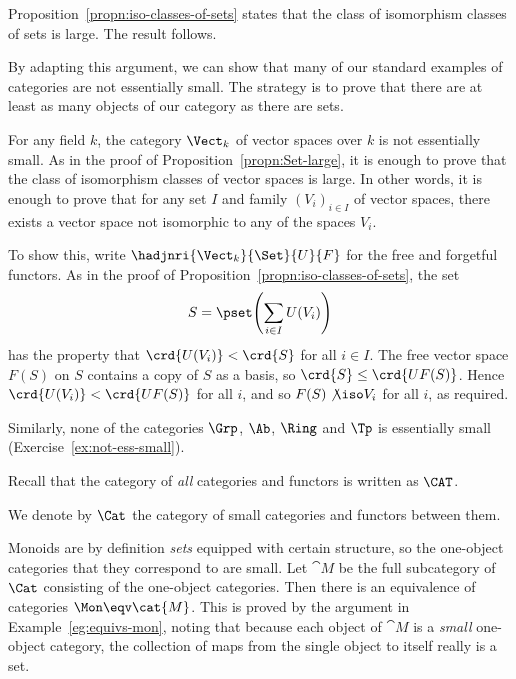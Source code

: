 \begin{pf}
Proposition~\ref{propn:iso-classes-of-sets} states that the class of
isomorphism classes of sets is large.  The result follows.
\end{pf}

By adapting this argument, we can show that many of our standard examples
of categories are not essentially small.  The strategy is to prove that
there are at least as many objects of our category as there are sets.

\begin{example}
For any field $k$, the category $\Vect_k$ of vector%
%
%
spaces over $k$ is not essentially small.  As in the proof of
Proposition~\ref{propn:Set-large}, it is enough to prove that the class of
isomorphism classes of vector spaces is large.  In other words, it is
enough to prove that for any set $I$ and family $(V_i)_{i \in I}$ of vector
spaces, there exists a vector space not isomorphic to any of the spaces
$V_i$.

To show this, write $\hadjnri{\Vect_k}{\Set}{U}{F}$ for the free
and forgetful functors.  As in the proof of
Proposition~\ref{propn:iso-classes-of-sets}, the set
\[
S = \pset \Biggl( \sum_{i \in I} U(V_i) \Biggr) 
\]
has the property that $\crd{U(V_i)} < \crd{S}$ for all $i \in I$.  The free
vector space $F(S)$ on $S$ contains a copy of $S$ as a basis, so $\crd{S}
\leq \crd{UF(S)}$.  Hence $\crd{U(V_i)} < \crd{UF(S)}$ for all $i$, and so
$F(S) \not\iso V_i$ for all $i$, as required.
\end{example}

Similarly, none of the categories $\Grp$,%
%
%
$\Ab$, $\Ring$%
%
%
and $\Tp$%
%
%
is essentially small (Exercise~\ref{ex:not-ess-small}).

Recall that the category of \emph{all} categories and functors is written
as $\CAT$.  

\begin{defn}    
\label{defn:Cat}
We denote by $\Cat$%
%
%
%
the category of small categories and functors between them.
\end{defn}

\begin{example} 
\label{eg:mon-one-obj-eqv}
Monoids are by definition \emph{sets} equipped with certain structure, so
the one-object%
%
%
categories that they correspond to are small.  Let $\cat{M}$ be the full
subcategory of $\Cat$ consisting of the one-object categories.  Then there
is an equivalence of categories $\Mon \eqv \cat{M}$.  This is proved by the
argument in Example~\ref{eg:equivs-mon}, noting that because each object of
$\cat{M}$ is a \emph{small} one-object category, the collection of maps
from the single object to itself really is a set.
\end{example}


